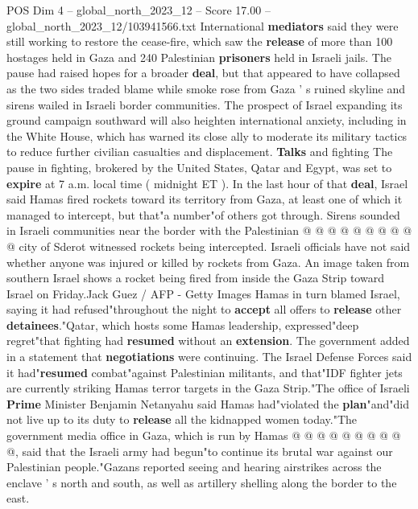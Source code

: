 \begin{textsample}{POS Dim 4 – global\_north\_2023\_12 – Score 17.00 – global\_north\_2023\_12/103941566.txt}  \label{ex:f4_pos_316}
International \textbf{mediators} said they were still working to restore the cease-fire, which saw the \textbf{release} of more than 100 hostages held in Gaza and 240 Palestinian \textbf{prisoners} held in Israeli jails.
The pause had raised hopes for a broader \textbf{deal}, but that appeared to have collapsed as the two sides traded blame while smoke rose from Gaza ' s ruined skyline and sirens wailed in Israeli border communities.
The prospect of Israel expanding its ground campaign southward will also heighten international anxiety, including in the White House, which has warned its close ally to moderate its military tactics to reduce further civilian casualties and displacement. \textbf{Talks} and fighting The pause in fighting, brokered by the United States, Qatar and Egypt, was set to \textbf{expire} at 7 a.m. local time ( midnight ET ).
In the last hour of that \textbf{deal}, Israel said Hamas fired rockets toward its territory from Gaza, at least one of which it managed to intercept, but that"a number"of others got through.
Sirens sounded in Israeli communities near the border with the Palestinian @ @ @ @ @ @ @ @ @ @ city of Sderot witnessed rockets being intercepted.
Israeli officials have not said whether anyone was injured or killed by rockets from Gaza.
An image taken from southern Israel shows a rocket being fired from inside the Gaza Strip toward Israel on Friday.Jack Guez / AFP - Getty Images Hamas in turn blamed Israel, saying it had refused"throughout the night to \textbf{accept} all offers to \textbf{release} other \textbf{detainees}."Qatar, which hosts some Hamas leadership, expressed"deep regret"that fighting had \textbf{resumed} without an \textbf{extension}.
The government added in a statement that \textbf{negotiations} were continuing.
The Israel Defense Forces said it had"\textbf{resumed} combat"against Palestinian militants, and that"IDF fighter jets are currently striking Hamas terror targets in the Gaza Strip."The office of Israeli \textbf{Prime} Minister Benjamin Netanyahu said Hamas had"violated the \textbf{plan}"and"did not live up to its duty to \textbf{release} all the kidnapped women today."The government media office in Gaza, which is run by Hamas @ @ @ @ @ @ @ @ @ @, said that the Israeli army had begun"to continue its brutal war against our Palestinian people."Gazans reported seeing and hearing airstrikes across the enclave ' s north and south, as well as artillery shelling along the border to the east.

\end{textsample}
